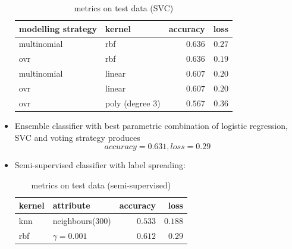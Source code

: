 \documentclass[fleqn,10pt]{SelfArx} %
\begin{document}
\begin{itemize}
  \begin{table}[H]
    \caption{metrics on test data (SVC)}
    \centering
    \begin{tabular}{llrr}
      \toprule
      modelling strategy & kernel & accuracy & loss \\
      \midrule
      multinomial & rbf & $0.636$ & $0.27$ \\
      ovr & rbf & $0.636$ & $0.19$ \\
      multinomial & linear & $0.607$ & $0.20$ \\
      ovr & linear & $0.607$ & $0.20$ \\
      ovr & poly (degree 3) & $0.567$ & $0.36$ \\
      \bottomrule
    \end{tabular}
  \end{table}
  \item Ensemble classifier with best parametric combination of logistic regression, SVC and voting strategy produces
  $$accuracy = 0.631, loss = 0.29$$
  \item Semi-supervised classifier with label spreading:
  \begin{table}[H]
    \caption{metrics on test data (semi-supervised)}
    \centering
    \begin{tabular}{llrr}
      \toprule
      kernel & attribute & accuracy & loss\\
      \midrule
      knn & neighbours(300) & $0.533$ & $0.188$ \\
      rbf & $\gamma=0.001$ & $0.612$ & $0.29$ \\
      \bottomrule
    \end{tabular}
  \end{table}
\end{itemize}
\end{document}
